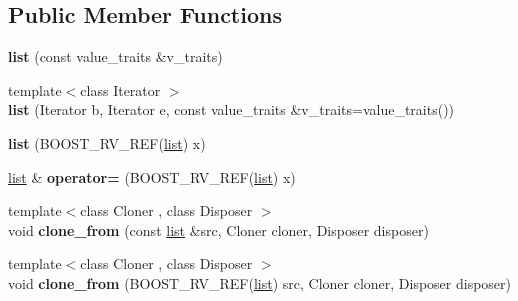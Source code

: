 \subsection*{Public Member Functions}
\begin{DoxyCompactItemize}
\item 
\mbox{\label{classboost_1_1intrusive_1_1list_a1fdd256ce8cea0dda5b0a3166f6a30e2}} 
{\bfseries list} (const value\+\_\+traits \&v\+\_\+traits)
\item 
\mbox{\label{classboost_1_1intrusive_1_1list_a0465fd895d60bb9b4e7a4cc57aeae020}} 
{\footnotesize template$<$class Iterator $>$ }\\{\bfseries list} (Iterator b, Iterator e, const value\+\_\+traits \&v\+\_\+traits=value\+\_\+traits())
\item 
\mbox{\label{classboost_1_1intrusive_1_1list_a92f4f5f8207fccb75d232beee75ec74f}} 
{\bfseries list} (B\+O\+O\+S\+T\+\_\+\+R\+V\+\_\+\+R\+EF(\hyperlink{classboost_1_1intrusive_1_1list}{list}) x)
\item 
\mbox{\label{classboost_1_1intrusive_1_1list_a8f26181bcd829be5c6c8588b75745a2d}} 
\hyperlink{classboost_1_1intrusive_1_1list}{list} \& {\bfseries operator=} (B\+O\+O\+S\+T\+\_\+\+R\+V\+\_\+\+R\+EF(\hyperlink{classboost_1_1intrusive_1_1list}{list}) x)
\item 
\mbox{\label{classboost_1_1intrusive_1_1list_abd5a0ff454d12980a7854763f7787925}} 
{\footnotesize template$<$class Cloner , class Disposer $>$ }\\void {\bfseries clone\+\_\+from} (const \hyperlink{classboost_1_1intrusive_1_1list}{list} \&src, Cloner cloner, Disposer disposer)
\item 
\mbox{\label{classboost_1_1intrusive_1_1list_a385d08ac3e61f67a63671ec827f39a39}} 
{\footnotesize template$<$class Cloner , class Disposer $>$ }\\void {\bfseries clone\+\_\+from} (B\+O\+O\+S\+T\+\_\+\+R\+V\+\_\+\+R\+EF(\hyperlink{classboost_1_1intrusive_1_1list}{list}) src, Cloner cloner, Disposer disposer)
\end{DoxyCompactItemize}
